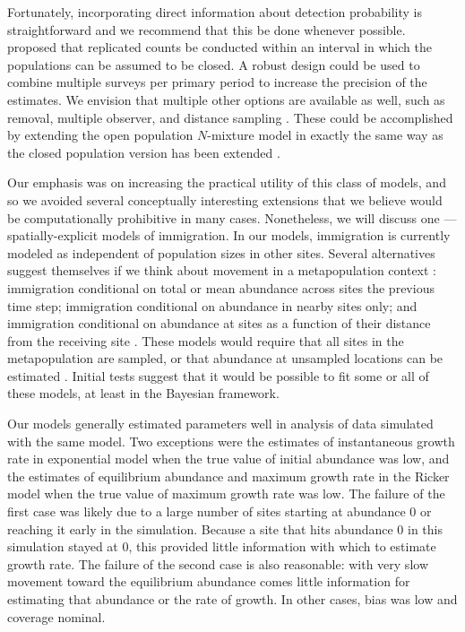 \documentclass[12pt,english]{article}
\begin{document}
\begin{spacing}{1.9}
\begin{flushleft}
Fortunately, incorporating direct information about detection probability 
is straightforward and we recommend that this be done whenever
possible. \citet{dail_madsen:2011} proposed that
replicated counts be conducted within an interval in which the populations can 
be assumed to be closed. A robust design \citep{pollock:1982} could be 
used to combine multiple surveys per
primary period to increase the precision of the estimates. We envision
that multiple other options are available as well, such as removal,
multiple observer, and distance sampling \citep{williams_etal:2002}. These could be
accomplished by extending the open population $N$-mixture model
in exactly the same way as the closed population version has been
extended \citep[e.g.,][]{royle_etal:2004}.

Our emphasis was on increasing the practical utility of this
class of models, and so we avoided several conceptually interesting
extensions that we believe would be computationally prohibitive in many
cases. Nonetheless, we will discuss one --- spatially-explicit models of
immigration. 
In our models, immigration is currently modeled as independent of
population sizes in other sites. Several alternatives suggest
themselves if we think about movement in a metapopulation
context \citep{hanski:1998}: immigration conditional on total or mean
abundance across sites the previous time step; immigration
conditional on abundance in nearby sites only; and immigration
conditional on abundance at sites as a function of their distance
from the receiving site \citep{hastings:1991,hanski:1998}. These models would
require that all sites in the metapopulation are sampled, or that abundance at 
unsampled locations can be estimated \citep{lele_etal:1998}. 
Initial tests suggest that it would be
possible to fit some or all of these models, at least in the
Bayesian framework.

Our models generally estimated parameters well in analysis of data simulated with the same model.
Two exceptions were the estimates of instantaneous growth rate in exponential model when the 
true value of initial abundance was low, and the estimates of equilibrium abundance and maximum
growth rate in the Ricker model when the true value of maximum growth rate was low.  
The failure of the first case was likely due to a large number of sites starting at abundance 0 or reaching it early in the simulation.  
Because a site that hits abundance 0 in this simulation stayed at 0, this provided little information with
which to estimate growth rate.  The failure of the second case is also reasonable: with very
slow movement toward the equilibrium abundance comes little information for estimating
that abundance or the rate of growth.  In other cases, bias was low and coverage nominal.


\end{flushleft}
\end{spacing}
\end{document}
